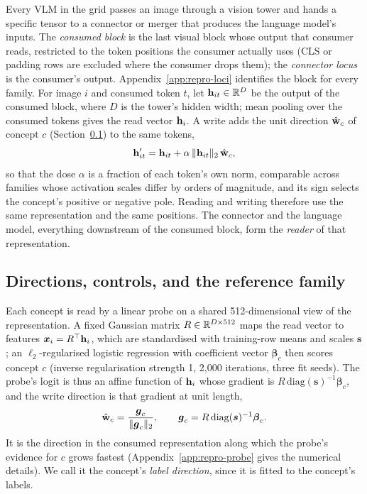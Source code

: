 \documentclass{article}
\begin{document}
Every VLM in the grid passes an image through a vision tower and hands a specific tensor to a connector or merger that produces the language model's inputs. The \emph{consumed block} is the last visual block whose output that consumer reads, restricted to the token positions the consumer actually uses (CLS or padding rows are excluded where the consumer drops them); the \emph{connector locus} is the consumer's output. Appendix~\ref{app:repro-loci} identifies the block for every family. For image $i$ and consumed token $t$, let $\mathbf{h}_{it}\in\mathbb{R}^D$ be the output of the consumed block, where $D$ is the tower's hidden width; mean pooling over the consumed tokens gives the read vector $\mathbf{h}_i$. A write adds the unit direction $\hat{\mathbf{w}}_c$ of concept $c$ (Section~\ref{sec:directions}) to the same tokens,
\begin{equation}
\mathbf{h}'_{it}=\mathbf{h}_{it}+\alpha\,\lVert\mathbf{h}_{it}\rVert_2\,\hat{\mathbf{w}}_c,
\label{eq:intervention}
\end{equation}
so that the dose $\alpha$ is a fraction of each token's own norm, comparable across families whose activation scales differ by orders of magnitude, and its sign selects the concept's positive or negative pole. Reading and writing therefore use the same representation and the same positions. The connector and the language model, everything downstream of the consumed block, form the \emph{reader} of that representation.

\subsection{Directions, controls, and the reference family}
\label{sec:directions}

Each concept is read by a linear probe on a shared 512-dimensional view of the representation. A fixed Gaussian matrix $R\in\mathbb{R}^{D\times512}$ maps the read vector to features $\boldsymbol x_i=R^{\top}\mathbf{h}_i$, which are standardised with training-row means and scales $\boldsymbol s$; an $\ell_2$-regularised logistic regression with coefficient vector $\boldsymbol\beta_c$ then scores concept $c$ (inverse regularisation strength 1, 2{,}000 iterations, three fit seeds). The probe's logit is thus an affine function of $\mathbf{h}_i$ whose gradient is $R\,\mathrm{diag}(\boldsymbol s)^{-1}\boldsymbol\beta_c$, and the write direction is that gradient at unit length,
\begin{equation}
\hat{\mathbf{w}}_c=\frac{\boldsymbol g_c}{\lVert\boldsymbol g_c\rVert_2},\qquad \boldsymbol g_c=R\,\mathrm{diag}(\boldsymbol s)^{-1}\boldsymbol\beta_c .
\label{eq:lift}
\end{equation}
It is the direction in the consumed representation along which the probe's evidence for $c$ grows fastest (Appendix~\ref{app:repro-probe} gives the numerical details). We call it the concept's \emph{label direction}, since it is fitted to the concept's labels.
\end{document}
